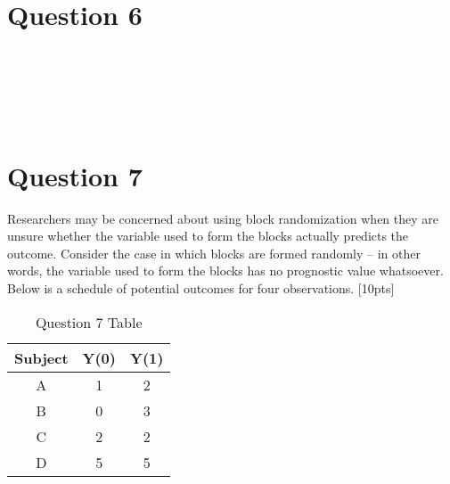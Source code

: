 \documentclass[11pt,notitlepage]{article}\usepackage[]{graphicx}\usepackage[]{color}
\makeatletter
\newenvironment{kframe}{%
 \def\at@end@of@kframe{}%
 \ifinner\ifhmode%
  \def\at@end@of@kframe{\end{minipage}}%
  \begin{minipage}{\columnwidth}%
 \fi\fi%
 \def\FrameCommand##1{\hskip\@totalleftmargin \hskip-\fboxsep
 \colorbox{shadecolor}{##1}\hskip-\fboxsep
     \hskip-\linewidth \hskip-\@totalleftmargin \hskip\columnwidth}%
 \MakeFramed {\advance\hsize-\width
   \@totalleftmargin\z@ \linewidth\hsize
   \@setminipage}}%
 {\par\unskip\endMakeFramed%
 \at@end@of@kframe}
\newenvironment{knitrout}{}{} %
\makeatother
\begin{document}
\section*{Question 6}

\begin{knitrout}
\color{fgcolor}\begin{kframe}
\begin{verbatim}






\end{verbatim}
\end{kframe}
\end{knitrout}


\section*{Question 7}
Researchers may be concerned about using block randomization when they are unsure whether the variable used to form the blocks actually predicts the outcome. Consider the case in which blocks are formed randomly -- in other words, the variable used to form the blocks has no prognostic value whatsoever. Below is a schedule of potential outcomes for four observations. [10pts]

\begin{table}[H]
  \centering
  \caption{Question 7 Table}
    \begin{tabular}{ccc}
    \toprule
    Subject & Y(0)  & Y(1) \\
    \midrule
    A     & 1     & 2 \\
    B     & 0     & 3 \\
    C     & 2     & 2 \\
    D     & 5     & 5 \\
    \bottomrule
    \end{tabular}%
  \label{tab:addlabel}%
\end{table}%
\end{document}
